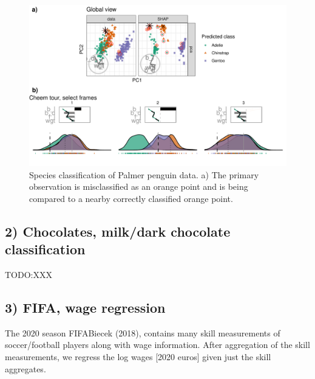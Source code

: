 \documentclass[
]{article}
\begin{document}
\begin{figure}

{\centering \includegraphics[width=1\linewidth]{./figures/case_penguins} 

}

\caption{Species classification of Palmer penguin data. a) The primary observation is misclassified as an orange point and is being compared to a nearby correctly classified orange point.}\label{fig:casepenguins}
\end{figure}

\hypertarget{chocolates-milkdark-chocolate-classification}{%
\subsection{2) Chocolates, milk/dark chocolate classification}\label{chocolates-milkdark-chocolate-classification}}

TODO:XXX

\hypertarget{fifa-wage-regression}{%
\subsection{3) FIFA, wage regression}\label{fifa-wage-regression}}

The 2020 season FIFABiecek (2018), contains many skill measurements of soccer/football players along with wage information. After aggregation of the skill measurements, we regress the log wages {[}2020 euros{]} given just the skill aggregates.
\end{document}

